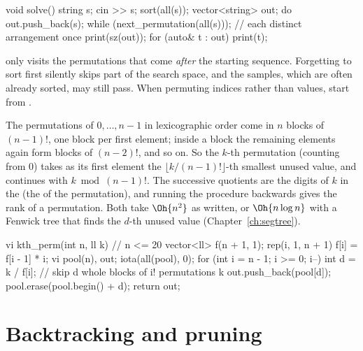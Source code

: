 \begin{code}
void solve() {
    string s;
    cin >> s;
    sort(all(s));
    vector<string> out;
    do out.push_back(s);
    while (next_permutation(all(s)));  // each distinct arrangement once
    print(sz(out));
    for (auto& t : out) print(t);
}
\end{code}


\begin{pitfall}
 only visits the permutations that come \emph{after} the starting sequence. Forgetting to sort first
silently skips part of the search space, and the samples, which are often already sorted, may still pass. When permuting
indices rather than values, start from .
\end{pitfall}

\begin{trick}
The permutations of $0, \ldots, n-1$ in lexicographic order come in $n$ blocks of $(n-1)!$, one block per first element;
inside a block the remaining elements again form blocks of $(n-2)!$, and so on. So the $k$-th permutation (counting from 0)
takes as its first element the $\lfloor k/(n-1)! \rfloor$-th smallest unused value, and continues with $k \bmod (n-1)!$.
The successive quotients are the digits of $k$ in the  (the  of the
permutation), and running the procedure backwards gives the rank of a permutation. Both take $\Oh{n^2}$ as written, or
$\Oh{n \log n}$ with a Fenwick tree that finds the $d$-th unused value (Chapter~\ref{ch:segtree}).
\begin{code}
vi kth_perm(int n, ll k) {  // n <= 20
    vector<ll> f(n + 1, 1);
    rep(i, 1, n + 1) f[i] = f[i - 1] * i;
    vi pool(n), out;
    iota(all(pool), 0);
    for (int i = n - 1; i >= 0; i--) {
        int d = k / f[i];  // skip d whole blocks of i! permutations
        k %
        out.push_back(pool[d]);
        pool.erase(pool.begin() + d);
    }
    return out;
}
\end{code}
\end{trick}

\section[Backtracking and pruning]{Backtracking and pruning \hfill \silver}\label{sec:backtracking}

